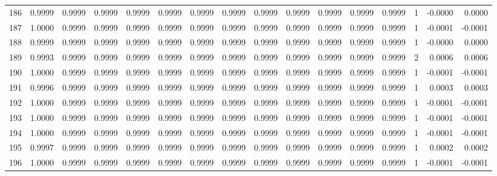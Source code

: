 \begin{tabular}{lrrrrrrrrrrrrrrr}
186 &      0.9999 &  0.9999 &  0.9999 &  0.9999 &  0.9999 &  0.9999 &  0.9999 &  0.9999 &  0.9999 &  0.9999 &   0.9999 &     0.9999 &      1 &                   -0.0000 &                     0.0000 \\
187 &      1.0000 &  0.9999 &  0.9999 &  0.9999 &  0.9999 &  0.9999 &  0.9999 &  0.9999 &  0.9999 &  0.9999 &   0.9999 &     0.9999 &      1 &                   -0.0001 &                    -0.0001 \\
188 &      0.9999 &  0.9999 &  0.9999 &  0.9999 &  0.9999 &  0.9999 &  0.9999 &  0.9999 &  0.9999 &  0.9999 &   0.9999 &     0.9999 &      1 &                   -0.0000 &                     0.0000 \\
189 &      0.9993 &  0.9999 &  0.9999 &  0.9999 &  0.9999 &  0.9999 &  0.9999 &  0.9999 &  0.9999 &  0.9999 &   0.9999 &     0.9999 &      2 &                    0.0006 &                     0.0006 \\
190 &      1.0000 &  0.9999 &  0.9999 &  0.9999 &  0.9999 &  0.9999 &  0.9999 &  0.9999 &  0.9999 &  0.9999 &   0.9999 &     0.9999 &      1 &                   -0.0001 &                    -0.0001 \\
191 &      0.9996 &  0.9999 &  0.9999 &  0.9999 &  0.9999 &  0.9999 &  0.9999 &  0.9999 &  0.9999 &  0.9999 &   0.9999 &     0.9999 &      1 &                    0.0003 &                     0.0003 \\
192 &      1.0000 &  0.9999 &  0.9999 &  0.9999 &  0.9999 &  0.9999 &  0.9999 &  0.9999 &  0.9999 &  0.9999 &   0.9999 &     0.9999 &      1 &                   -0.0001 &                    -0.0001 \\
193 &      1.0000 &  0.9999 &  0.9999 &  0.9999 &  0.9999 &  0.9999 &  0.9999 &  0.9999 &  0.9999 &  0.9999 &   0.9999 &     0.9999 &      1 &                   -0.0001 &                    -0.0001 \\
194 &      1.0000 &  0.9999 &  0.9999 &  0.9999 &  0.9999 &  0.9999 &  0.9999 &  0.9999 &  0.9999 &  0.9999 &   0.9999 &     0.9999 &      1 &                   -0.0001 &                    -0.0001 \\
195 &      0.9997 &  0.9999 &  0.9999 &  0.9999 &  0.9999 &  0.9999 &  0.9999 &  0.9999 &  0.9999 &  0.9999 &   0.9999 &     0.9999 &      1 &                    0.0002 &                     0.0002 \\
196 &      1.0000 &  0.9999 &  0.9999 &  0.9999 &  0.9999 &  0.9999 &  0.9999 &  0.9999 &  0.9999 &  0.9999 &   0.9999 &     0.9999 &      1 &                   -0.0001 &                    -0.0001 \\

\end{tabular}
